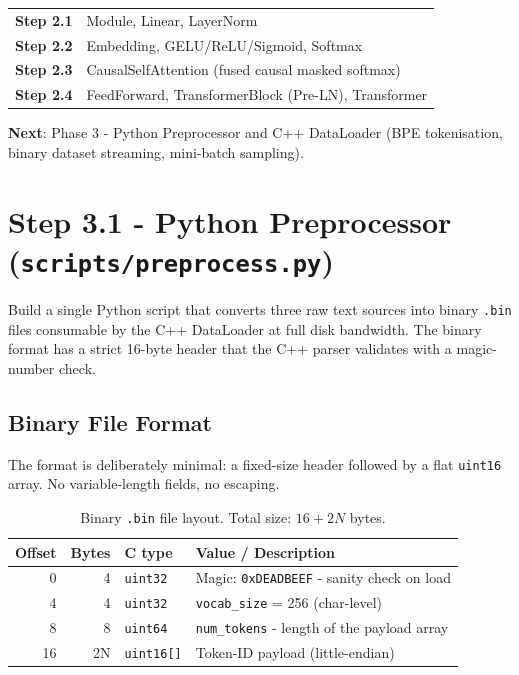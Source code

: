 \documentclass[12pt, a4paper]{article}
\begin{document}
\begin{tcolorbox}[designbox, title={Phase 2 Complete - All NN Layers Implemented}]
  \begin{tabular}{@{} l l @{}}
    \textbf{Step 2.1} & Module, Linear, LayerNorm \\
    \textbf{Step 2.2} & Embedding, GELU/ReLU/Sigmoid, Softmax \\
    \textbf{Step 2.3} & CausalSelfAttention (fused causal masked softmax) \\
    \textbf{Step 2.4} & FeedForward, TransformerBlock (Pre-LN), Transformer \\
  \end{tabular}

  \medskip
  \textbf{Next}: Phase 3 - Python Preprocessor and C++ DataLoader
  (BPE tokenisation, binary dataset streaming, mini-batch sampling).
\end{tcolorbox}

\section{Step 3.1 - Python Preprocessor (\texttt{scripts/preprocess.py})}

\begin{tcolorbox}[designbox, title={Step 3.1 Goal}]
  Build a single Python script that converts three raw text sources into
  binary \texttt{.bin} files consumable by the C++ DataLoader at full disk
  bandwidth.  The binary format has a strict 16-byte header that the C++
  parser validates with a magic-number check.
\end{tcolorbox}

\subsection{Binary File Format}

The format is deliberately minimal: a fixed-size header followed by a flat
\texttt{uint16} array.  No variable-length fields, no escaping.

\begin{table}[!ht]
\centering
\renewcommand{\arraystretch}{1.3}
\begin{tabular}{@{} r r l p{8cm} @{}}
\toprule
\textbf{Offset} & \textbf{Bytes} & \textbf{C type} & \textbf{Value / Description} \\
\midrule
0  &  4 & \texttt{uint32} & Magic: \texttt{0xDEADBEEF} - sanity check on load \\
4  &  4 & \texttt{uint32} & \texttt{vocab\_size} = 256 (char-level) \\
8  &  8 & \texttt{uint64} & \texttt{num\_tokens} - length of the payload array \\
16 & 2N & \texttt{uint16[]} & Token-ID payload (little-endian) \\
\bottomrule
\end{tabular}
\caption{Binary \texttt{.bin} file layout.  Total size: $16 + 2N$ bytes.}
\end{table}
\end{document}
